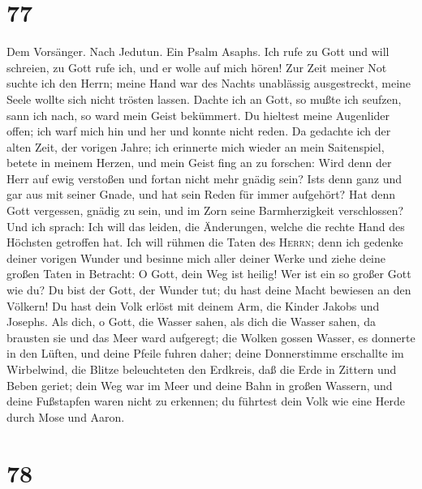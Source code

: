 \hypertarget{section-76}{%
\section{77}\label{section-76}}

 Dem Vorsänger. Nach Jedutun. Ein Psalm Asaphs. Ich rufe
zu Gott und will schreien, zu Gott rufe ich, und er wolle auf mich
hören!  Zur Zeit meiner Not suchte ich den Herrn; meine
Hand war des Nachts unablässig ausgestreckt, meine Seele wollte sich
nicht trösten lassen.  Dachte ich an Gott, so mußte ich
seufzen, sann ich nach, so ward mein Geist bekümmert.  Du
hieltest meine Augenlider offen; ich warf mich hin und her und konnte
nicht reden.  Da gedachte ich der alten Zeit, der vorigen
Jahre;  ich erinnerte mich wieder an mein Saitenspiel,
betete in meinem Herzen, und mein Geist fing an zu forschen:
 Wird denn der Herr auf ewig verstoßen und fortan nicht
mehr gnädig sein?  Ist\textquotesingle s denn ganz und gar
aus mit seiner Gnade, und hat sein Reden für immer aufgehört?
 Hat denn Gott vergessen, gnädig zu sein, und im Zorn
seine Barmherzigkeit verschlossen?  Und ich sprach: Ich
will das leiden, die Änderungen, welche die rechte Hand des Höchsten
getroffen hat.  Ich will rühmen die Taten des
\textsc{Herrn}; denn ich gedenke deiner vorigen Wunder 
und besinne mich aller deiner Werke und ziehe deine großen Taten in
Betracht:  O Gott, dein Weg ist heilig! Wer ist ein so
großer Gott wie du?  Du bist der Gott, der Wunder tut; du
hast deine Macht bewiesen an den Völkern!  Du hast dein
Volk erlöst mit deinem Arm, die Kinder Jakobs und Josephs.
 Als dich, o Gott, die Wasser sahen, als dich die Wasser
sahen, da brausten sie und das Meer ward aufgeregt;  die
Wolken gossen Wasser, es donnerte in den Lüften, und deine Pfeile fuhren
daher;  deine Donnerstimme erschallte im Wirbelwind, die
Blitze beleuchteten den Erdkreis, daß die Erde in Zittern und Beben
geriet;  dein Weg war im Meer und deine Bahn in großen
Wassern, und deine Fußstapfen waren nicht zu erkennen; 
du führtest dein Volk wie eine Herde durch Mose und Aaron.

\hypertarget{section-77}{%
\section{78}\label{section-77}}


